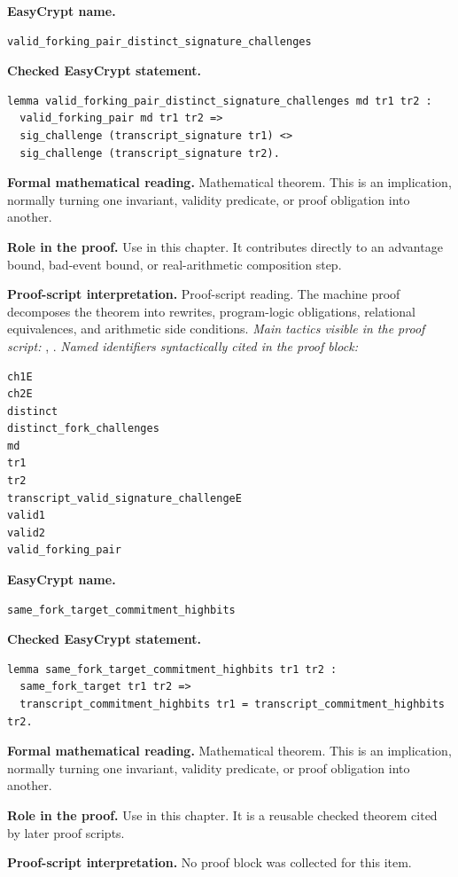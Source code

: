 \begin{formaltheorem}
\noindent\textbf{EasyCrypt name.}
\begin{lstlisting}[language=EasyCrypt,basicstyle=\ttfamily\scriptsize]
valid_forking_pair_distinct_signature_challenges
\end{lstlisting}
\noindent\textbf{Checked EasyCrypt statement.}
\begin{lstlisting}[language=EasyCrypt,basicstyle=\ttfamily\scriptsize]
lemma valid_forking_pair_distinct_signature_challenges md tr1 tr2 :
  valid_forking_pair md tr1 tr2 =>
  sig_challenge (transcript_signature tr1) <>
  sig_challenge (transcript_signature tr2).
\end{lstlisting}
\noindent\textbf{Formal mathematical reading.}
Mathematical theorem. This is an implication, normally turning one invariant, validity predicate, or proof obligation into another.

\noindent\textbf{Role in the proof.}
Use in this chapter. It contributes directly to an advantage bound, bad-event bound, or real-arithmetic composition step.

\noindent\textbf{Proof-script interpretation.}
Proof-script reading. The machine proof decomposes the theorem into rewrites, program-logic obligations, relational equivalences, and arithmetic side conditions.
\emph{Main tactics visible in the proof script:} , .
\emph{Named identifiers syntactically cited in the proof block:}
\begin{lstlisting}[language=EasyCrypt,basicstyle=\ttfamily\scriptsize]
ch1E
ch2E
distinct
distinct_fork_challenges
md
tr1
tr2
transcript_valid_signature_challengeE
valid1
valid2
valid_forking_pair
\end{lstlisting}

\end{formaltheorem}

\begin{formaltheorem}
\noindent\textbf{EasyCrypt name.}
\begin{lstlisting}[language=EasyCrypt,basicstyle=\ttfamily\scriptsize]
same_fork_target_commitment_highbits
\end{lstlisting}
\noindent\textbf{Checked EasyCrypt statement.}
\begin{lstlisting}[language=EasyCrypt,basicstyle=\ttfamily\scriptsize]
lemma same_fork_target_commitment_highbits tr1 tr2 :
  same_fork_target tr1 tr2 =>
  transcript_commitment_highbits tr1 = transcript_commitment_highbits tr2.
\end{lstlisting}
\noindent\textbf{Formal mathematical reading.}
Mathematical theorem. This is an implication, normally turning one invariant, validity predicate, or proof obligation into another.

\noindent\textbf{Role in the proof.}
Use in this chapter. It is a reusable checked theorem cited by later proof scripts.

\noindent\textbf{Proof-script interpretation.}
No proof block was collected for this item.

\end{formaltheorem}

